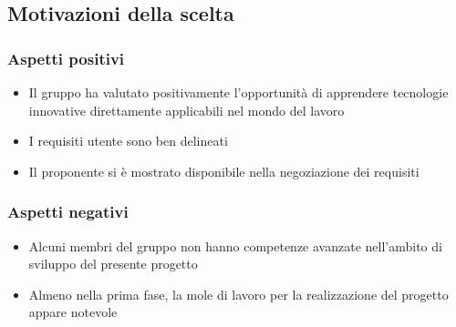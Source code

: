 \subsection{Motivazioni della scelta}
\subsubsection{Aspetti positivi}
\begin{itemize}
\item Il gruppo ha valutato positivamente l'opportunit\`a di apprendere tecnologie innovative
  direttamente applicabili nel mondo del lavoro
\item I requisiti utente sono ben delineati
\item Il proponente si \`e mostrato disponibile nella negoziazione dei requisiti
\end{itemize}

\subsubsection{Aspetti negativi}
\begin{itemize}
\item Alcuni membri del gruppo non hanno competenze avanzate nell'ambito di sviluppo del presente progetto
\item Almeno nella prima fase, la mole di lavoro per la realizzazione del progetto appare notevole
\end{itemize}

